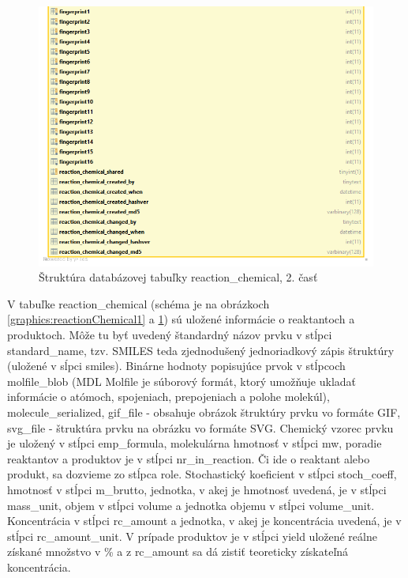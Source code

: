 \documentclass[thesis=M,slovak]{FITthesis}[2013/05/06]
\begin{document}
\begin{figure}\centering
	\includegraphics[width=1.0\textwidth]{Schema_DB_Open_Enventory/reaction_chemical_2.png}
 	\caption[Štruktúra databázovej tabuľky reaction\_chemical, 2. časť]{Štruktúra databázovej tabuľky reaction\_chemical, 2. časť}\label{graphics:reactionChemical2}
\end{figure}

V tabuľke reaction\_chemical (schéma je na obrázkoch \ref{graphics:reactionChemical1} a \ref{graphics:reactionChemical2}) sú uložené informácie o reaktantoch a produktoch. Môže tu byť uvedený štandardný názov prvku v stĺpci standard\_name, tzv. SMILES teda zjednodušený jednoriadkový zápis štruktúry (uložené v sĺpci smiles). Binárne hodnoty popisujúce prvok v stĺpcoch molfile\_blob (MDL Molfile je súborový formát, ktorý umožňuje ukladať informácie o atómoch, spojeniach, prepojeniach a polohe molekúl), molecule\_serialized, gif\_file - obsahuje obrázok štruktúry prvku vo formáte GIF, svg\_file - štruktúra prvku na obrázku vo formáte SVG.
Chemický vzorec prvku je uložený v stĺpci emp\_formula, molekulárna hmotnosť v stĺpci mw, poradie reaktantov a produktov je v stĺpci nr\_in\_reaction. Či ide o reaktant alebo produkt, sa dozvieme zo stĺpca role. Stochastický koeficient v stĺpci stoch\_coeff, hmotnosť v stĺpci m\_brutto, jednotka, v akej je hmotnosť uvedená, je v stĺpci mass\_unit, objem v stĺpci volume a jednotka objemu v stĺpci volume\_unit. Koncentrácia v stĺpci rc\_amount a jednotka, v akej je koncentrácia uvedená, je v stĺpci rc\_amount\_unit.
V prípade produktov je v stĺpci yield uložené reálne získané množstvo v \% a z rc\_amount sa dá zistiť teoreticky získateľná koncentrácia.
\end{document}
